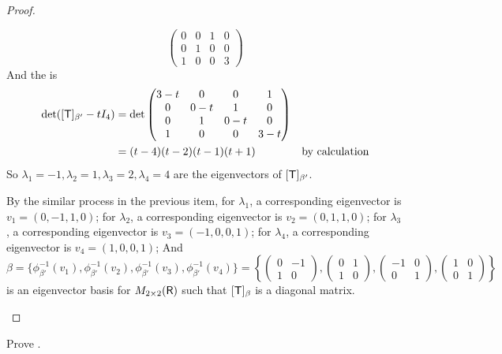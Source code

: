 \begin{proof}
\begin{enumerate}
\[\begin{pmatrix}
        0 & 0 & 1 & 0 \\
        0 & 1 & 0 & 0 \\
        1 & 0 & 0 & 3
    \end{pmatrix}
\]
And the \CPOLY{} is
\begin{align*}
    \det([\textsf{T}]_{\beta'} - t I_4)
    & = \det \begin{pmatrix}
        3-t & 0   & 0   & 1 \\
        0   & 0-t & 1   & 0 \\
        0   & 1   & 0-t & 0 \\
        1   & 0   & 0 & 3 -t
    \end{pmatrix} \\
    & = (t - 4)(t - 2)(t - 1)(t + 1) & \text{by calculation}
\end{align*}
So \(\lambda_1 = -1, \lambda_2 = 1, \lambda_3 = 2, \lambda_4 = 4\) are the eigenvectors of \([\textsf{T}]_{\beta'}\).

By the similar process in the previous item,
for \(\lambda_1\), a corresponding eigenvector is \(v_1 = (0, -1, 1, 0)\);
for \(\lambda_2\), a corresponding eigenvector is \(v_2 = (0, 1, 1, 0)\);
for \(\lambda_3\), a corresponding eigenvector is \(v_3 = (-1, 0, 0, 1)\);
for \(\lambda_4\), a corresponding eigenvector is \(v_4 = (1, 0, 0, 1)\);
And
\[
    \beta = \{ \phi_{\beta'}^{-1}(v_1), \phi_{\beta'}^{-1}(v_2), \phi_{\beta'}^{-1}(v_3), \phi_{\beta'}^{-1}(v_4) \}
    = \left\{
        \begin{pmatrix} 0 & -1 \\ 1 & 0 \end{pmatrix},
        \begin{pmatrix} 0 & 1 \\ 1 & 0 \end{pmatrix},
        \begin{pmatrix} -1 & 0 \\ 0 & 1 \end{pmatrix},
        \begin{pmatrix} 1 & 0 \\ 0 & 1 \end{pmatrix}
    \right\}
\]
is an eigenvector basis for \(M_{2 \times 2}(\textsf{R})\) such that \([\textsf{T}]_{\beta}\) is a diagonal matrix.
\end{enumerate}
\end{proof}

\begin{exercise} \label{exercise 5.1.6}
Prove .
\end{exercise}

